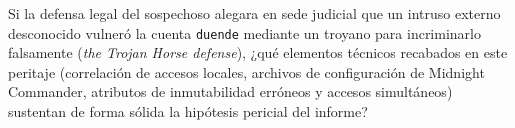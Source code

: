 \begin{retoforense}
Si la defensa legal del sospechoso alegara en sede judicial que un intruso externo desconocido vulneró la cuenta \texttt{duende} mediante un troyano para incriminarlo falsamente (\textit{the Trojan Horse defense}), ¿qué elementos técnicos recabados en este peritaje (correlación de accesos locales, archivos de configuración de Midnight Commander, atributos de inmutabilidad erróneos y accesos simultáneos) sustentan de forma sólida la hipótesis pericial del informe?
\end{retoforense}

